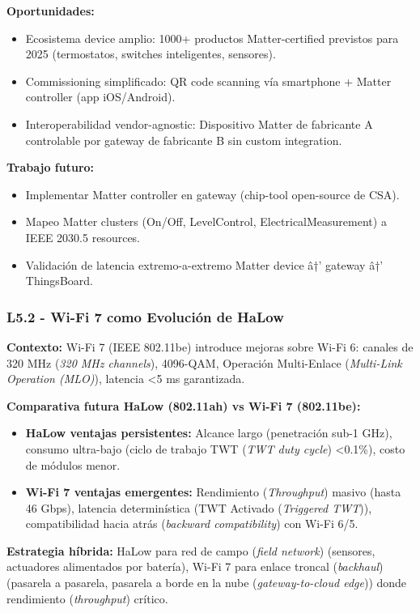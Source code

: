 \textbf{Oportunidades:}
\begin{itemize}
\item Ecosistema device amplio: 1000+ productos Matter-certified previstos para 2025 (termostatos, switches inteligentes, sensores).
\item Commissioning simplificado: QR code scanning vía smartphone + Matter controller (app iOS/Android).
\item Interoperabilidad vendor-agnostic: Dispositivo Matter de fabricante A controlable por gateway de fabricante B sin custom integration.
\end{itemize}

\textbf{Trabajo futuro:}
\begin{itemize}
\item Implementar Matter controller en gateway (chip-tool open-source de CSA).
\item Mapeo Matter clusters (On/Off, LevelControl, ElectricalMeasurement) a IEEE 2030.5 resources.
\item Validación de latencia extremo-a-extremo Matter device â†’ gateway â†’ ThingsBoard.
\end{itemize}

\subsubsection{L5.2 - Wi-Fi 7 como Evolución de HaLow}

\textbf{Contexto:} Wi-Fi 7 (IEEE 802.11be) introduce mejoras sobre Wi-Fi 6: canales de 320 MHz (\textit{320 MHz channels}), 4096-QAM, Operación Multi-Enlace (\textit{Multi-Link Operation (MLO)}), latencia <5 ms garantizada.

\textbf{Comparativa futura HaLow (802.11ah) vs Wi-Fi 7 (802.11be):}
\begin{itemize}
\item \textbf{HaLow ventajas persistentes:} Alcance largo (penetración sub-1 GHz), consumo ultra-bajo (ciclo de trabajo TWT (\textit{TWT duty cycle}) <0.1\%), costo de módulos menor.
\item \textbf{Wi-Fi 7 ventajas emergentes:} Rendimiento (\textit{Throughput}) masivo (hasta 46 Gbps), latencia determinística (TWT Activado (\textit{Triggered TWT})), compatibilidad hacia atrás (\textit{backward compatibility}) con Wi-Fi 6/5.
\end{itemize}

\textbf{Estrategia híbrida:} HaLow para red de campo (\textit{field network}) (sensores, actuadores alimentados por batería), Wi-Fi 7 para enlace troncal (\textit{backhaul}) (pasarela a pasarela, pasarela a borde en la nube (\textit{gateway-to-cloud edge})) donde rendimiento (\textit{throughput}) crítico.

